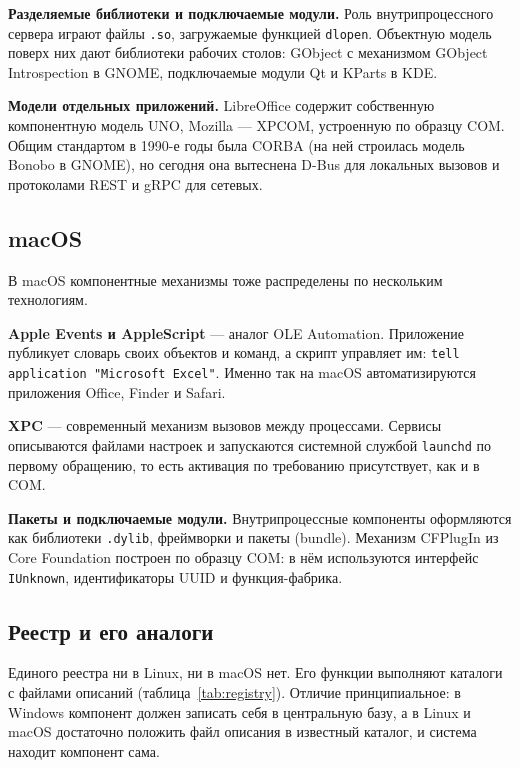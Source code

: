 \documentclass[14pt,a4paper]{extarticle}
\begin{document}
\textbf{Разделяемые библиотеки и подключаемые модули.} Роль внутрипроцессного сервера
играют файлы \texttt{.so}, загружаемые функцией \texttt{dlopen}. Объектную модель
поверх них дают библиотеки рабочих столов: GObject с механизмом
GObject Introspection в GNOME, подключаемые модули Qt и KParts в KDE.

\textbf{Модели отдельных приложений.} LibreOffice содержит собственную компонентную
модель UNO, Mozilla --- XPCOM, устроенную по образцу COM. Общим стандартом в 1990-е
годы была CORBA (на ней строилась модель Bonobo в GNOME), но сегодня она вытеснена
D-Bus для локальных вызовов и протоколами REST и gRPC для сетевых.

\subsection{macOS}

В macOS компонентные механизмы тоже распределены по нескольким технологиям.

\textbf{Apple Events и AppleScript} --- аналог OLE Automation. Приложение публикует
словарь своих объектов и команд, а скрипт управляет им:
\texttt{tell application "Microsoft Excel"}. Именно так на macOS автоматизируются
приложения Office, Finder и Safari.

\textbf{XPC} --- современный механизм вызовов между процессами. Сервисы описываются
файлами настроек и запускаются системной службой \texttt{launchd} по первому
обращению, то есть активация по требованию присутствует, как и в COM.

\textbf{Пакеты и подключаемые модули.} Внутрипроцессные компоненты оформляются как
библиотеки \texttt{.dylib}, фреймворки и пакеты (bundle). Механизм CFPlugIn из
Core Foundation построен по образцу COM: в нём используются интерфейс
\texttt{IUnknown}, идентификаторы UUID и функция-фабрика.

\subsection{Реестр и его аналоги}

Единого реестра ни в Linux, ни в macOS нет. Его функции выполняют каталоги с
файлами описаний (таблица~\ref{tab:registry}). Отличие принципиальное: в Windows
компонент должен записать себя в центральную базу, а в Linux и macOS достаточно
положить файл описания в известный каталог, и система находит компонент сама.
\end{document}

